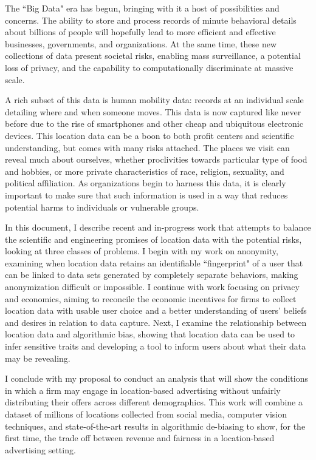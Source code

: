 The ``Big Data" era has begun, bringing with it a host of possibilities and concerns.
The ability to store and process records of minute behavioral details about billions of people will hopefully lead to more efficient and effective businesses, governments, and organizations.
At the same time, these new collections of data present societal risks, enabling mass surveillance, a potential loss of privacy, and the capability to computationally discriminate at massive scale.

A rich subset of this data is human mobility data: records at an individual scale detailing where and when someone moves.
This data is now captured like never before due to the rise of smartphones and other cheap and ubiquitous electronic devices.
This location data can be a boon to both profit centers and scientific understanding, but comes with many risks attached.
The places we visit can reveal much about ourselves, whether proclivities towards particular type of food and hobbies, or more private characteristics of race, religion, sexuality, and political affiliation.
As organizations begin to harness this data, it is clearly important to make sure that such information is used in a way that reduces potential harms to individuals or vulnerable groups.

In this document, I describe recent and in-progress work that attempts to balance the scientific and engineering promises of location data with the potential risks, looking at three classes of problems.
I begin with my work on anonymity, examining when location data retains an identifiable ``fingerprint" of a user that can be linked to data sets generated by completely separate behaviors, making anonymization difficult or impossible.
I continue with work focusing on privacy and economics, aiming to reconcile the economic incentives for firms to collect location data with usable user choice and a better understanding of users' beliefs and desires in relation to data capture.
Next, I examine the relationship between location data and algorithmic bias, showing that location data can be used to infer sensitive traits and developing a tool to inform users about what their data may be revealing.

I conclude with my proposal to conduct an analysis that will show the conditions in which a firm may engage in location-based advertising without unfairly distributing their offers across different demographics.
This work will combine a dataset of millions of locations collected from social media, computer vision techniques, and state-of-the-art results in algorithmic de-biasing to show, for the first time, the trade off between revenue and fairness in a location-based advertising setting.

